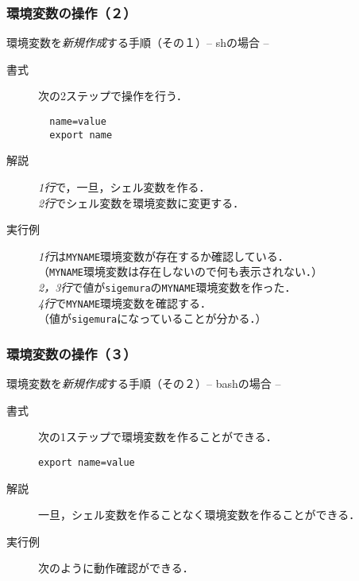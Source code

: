 \documentclass{beamer}                 %
\begin{document}
\begin{frame}[fragile]
  \frametitle{環境変数の操作（２）}
  環境変数を\emph{新規作成}する手順（その１）-- shの場合 --
\begin{description}
\item[書式] 次の2ステップで操作を行う．
\begin{lstlisting}
  name=value
  export name
\end{lstlisting}
\item[解説]
  \emph{1行}で，一旦，シェル変数を作る．\\
  \emph{2行}でシェル変数を環境変数に変更する．
\item[実行例]
  \emph{1行}は\texttt{MYNAME}環境変数が存在するか確認している．\\
  （\texttt{MYNAME}環境変数は存在しないので何も表示されない．）\\
  \emph{2，3行}で値が\texttt{sigemura}の\texttt{MYNAME}環境変数を作った．\\
  \emph{4行}で\texttt{MYNAME}環境変数を確認する．\\
  （値が\texttt{sigemura}になっていることが分かる．）
\end{description}
\end{frame}

\begin{frame}[fragile]
  \frametitle{環境変数の操作（３）}
  環境変数を\emph{新規作成}する手順（その２）-- bashの場合 --
\begin{description}
\item[書式]
  次の1ステップで環境変数を作ることができる．
\begin{lstlisting}[numbers=none]
  export name=value
\end{lstlisting}
\item[解説]
  一旦，シェル変数を作ることなく環境変数を作ることができる．
\item[実行例]
  次のように動作確認ができる．
\end{description}
\end{frame}
\end{document}

